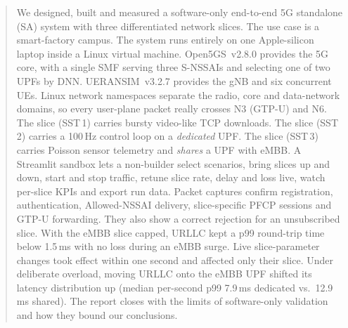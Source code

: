 \begin{abstract}
\noindent
We designed, built and measured a software-only end-to-end 5G standalone (SA) system with
three differentiated network slices. The use case is a smart-factory campus. The system runs
entirely on one Apple-silicon laptop inside a Linux virtual machine. Open5GS~v2.8.0 provides the
5G core, with a single SMF serving three S-NSSAIs and selecting one of two UPFs by DNN.
UERANSIM~v3.2.7 provides the gNB and six concurrent UEs. Linux network namespaces separate the
radio, core and data-network domains, so every user-plane packet really crosses N3 (GTP-U) and
N6. The  slice (SST\,1) carries bursty video-like TCP downloads. The 
slice (SST\,2) carries a 100\,Hz control loop on a \emph{dedicated} UPF. The  slice
(SST\,3) carries Poisson sensor telemetry and \emph{shares} a UPF with eMBB. A Streamlit sandbox
lets a non-builder select scenarios, bring slices up and down, start and stop traffic, retune
slice rate, delay and loss live, watch per-slice KPIs and export run data. Packet captures
confirm registration, authentication, Allowed-NSSAI delivery, slice-specific PFCP sessions and
GTP-U forwarding. They also show a correct rejection for an unsubscribed slice. With the eMBB slice
capped, URLLC kept a p99 round-trip time below 1.5\,ms with no loss during an eMBB surge.
Live slice-parameter changes took effect within one second and affected only their slice.
Under deliberate overload, moving URLLC onto the eMBB UPF shifted its latency distribution up
(median per-second p99 7.9\,ms dedicated vs.\ 12.9\,ms shared). The report closes with the limits of software-only
validation and how they bound our conclusions.
\end{abstract}
